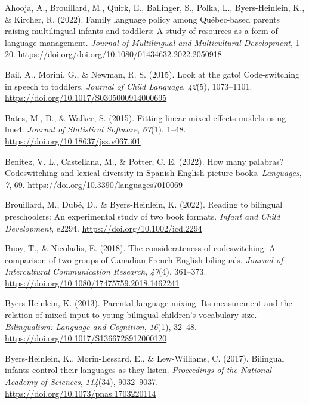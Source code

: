 \documentclass[
  man,floatsintext]{apa7}
\newlength{\cslhangindent}
\newlength{\cslentryspacingunit} %
\newenvironment{CSLReferences}[2] %
 {%
  \setlength{\parindent}{0pt}
  \ifodd #1
  \let\oldpar\par
  \def\par{\hangindent=\cslhangindent\oldpar}
  \fi
  \setlength{\parskip}{#2\cslentryspacingunit}
 }%
 {}
\begin{document}
\hypertarget{refs}{}
\begin{CSLReferences}{1}{0}
\leavevmode{}%
Ahooja, A., Brouillard, M., Quirk, E., Ballinger, S., Polka, L., Byers-Heinlein, K., \& Kircher, R. (2022). Family language policy among {Québec}-based parents raising multilingual infants and toddlers: A study of resources as a form of language management. \emph{Journal of Multilingual and Multicultural Development}, 1--20. \url{https://doi.org/doi.org/10.1080/01434632.2022.2050918}

\leavevmode{}%
Bail, A., Morini, G., \& Newman, R. S. (2015). Look at the gato! Code-switching in speech to toddlers. \emph{Journal of Child Language}, \emph{42}(5), 1073--1101. \url{https://doi.org/10.1017/S0305000914000695}

\leavevmode{}%
Bates, M., D., \& Walker, S. (2015). Fitting linear mixed-effects models using lme4. \emph{Journal of Statistical Software}, \emph{67}(1), 1--48. \url{https://doi.org/10.18637/jss.v067.i01}

\leavevmode{}%
Benitez, V. L., Castellana, M., \& Potter, C. E. (2022). How many palabras? Codeswitching and lexical diversity in {Spanish-English} picture books. \emph{Languages}, \emph{7}, 69. \url{https://doi.org/10.3390/languages7010069}

\leavevmode{}%
Brouillard, M., Dubé, D., \& Byers-Heinlein, K. (2022). Reading to bilingual preschoolers: An experimental study of two book formats. \emph{Infant and Child Development}, e2294. \url{https://doi.org/10.1002/icd.2294}

\leavevmode{}%
Buoy, T., \& Nicoladis, E. (2018). The considerateness of codeswitching: A comparison of two groups of {Canadian French-English} bilinguals. \emph{Journal of Intercultural Communication Research}, \emph{47}(4), 361--373. \url{https://doi.org/10.1080/17475759.2018.1462241}

\leavevmode{}%
Byers-Heinlein, K. (2013). Parental language mixing: Its measurement and the relation of mixed input to young bilingual children's vocabulary size. \emph{Bilingualism: Language and Cognition}, \emph{16}(1), 32--48. \url{https://doi.org/10.1017/S1366728912000120}

\leavevmode{}%
Byers-Heinlein, K., Morin-Lessard, E., \& Lew-Williams, C. (2017). Bilingual infants control their languages as they listen. \emph{Proceedings of the National Academy of Sciences}, \emph{114}(34), 9032--9037. \url{https://doi.org/10.1073/pnas.1703220114}


\end{CSLReferences}
\end{document}
